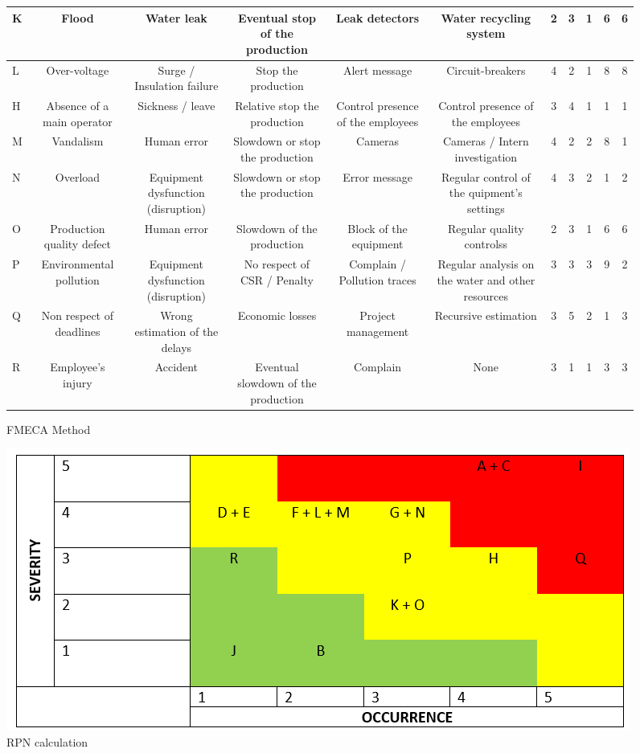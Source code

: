 \begin{figure}[h]
\begin{tabular}{| p{4cm} | c | c | c | c | c | c | c | c | c | c |}
        \hline
        K & Flood & Water leak & Eventual stop of the production & Leak detectors & Water recycling system & 2 & 3 & 1 & 6 & 6 \\
        \hline
        L & Over-voltage & Surge / Insulation failure & Stop the production & Alert message & Circuit-breakers & 4 & 2 & 1 & 8 & 8 \\
        \hline
        H & Absence of a main operator & Sickness / leave & Relative stop the production & Control presence of the employees & Control presence of the employees & 3 & 4 & 1 & 1 & 1 \\
        \hline
        M & Vandalism & Human error & Slowdown or stop the production & Cameras & Cameras / Intern investigation & 4 & 2 & 2 & 8 & 1 \\
        \hline
        N & Overload & Equipment dysfunction (disruption) & Slowdown or stop the production & Error message & Regular control of the quipment's settings & 4 & 3 & 2 & 1 & 2 \\
        \hline
        O & Production quality defect & Human error & Slowdown of the production & Block of the equipment & Regular quality controlss & 2 & 3 & 1 & 6 & 6 \\
        \hline
        P & Environmental pollution & Equipment dysfunction (disruption) & No respect of CSR / Penalty & Complain / Pollution traces & Regular analysis on the water and other resources & 3 & 3 & 3 & 9 & 2 \\
        \hline
        Q & Non respect of deadlines & Wrong estimation of the delays & Economic losses & Project management & Recursive estimation & 3 & 5 & 2 & 1 & 3 \\
        \hline
        R & Employee's injury & Accident & Eventual slowdown of the production & Complain & None & 3 & 1 & 1 & 3 & 3 \\
        \hline
    \end{tabular}
    \caption{FMECA Method}
    \end{figure}

    \begin{figure}[h]
        \centering
        \includegraphics{Img/rpn-calculation.png}
        \caption{RPN calculation}
    \end{figure}

